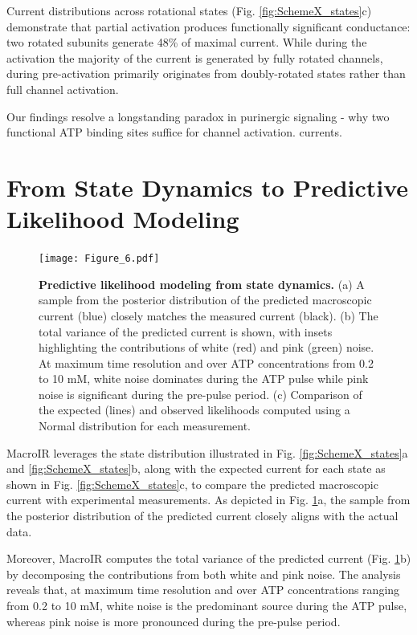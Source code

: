 \documentclass[pdflatex,sn-nature]{sn-jnl}%
\theoremstyle{thmstyleone}%
\theoremstyle{thmstyletwo}%
\theoremstyle{thmstylethree}%
\begin{document}
Current distributions across rotational states (Fig. \ref{fig:SchemeX_states}c) demonstrate that partial activation produces functionally significant conductance: two rotated subunits generate 48\% of maximal current. While during the activation the majority of the current is generated by fully rotated channels, during pre-activation primarily originates from doubly-rotated states rather than full channel activation.

Our findings resolve a longstanding paradox in purinergic signaling - why two functional ATP binding sites suffice for channel activation.  currents. 

\section{From State Dynamics to Predictive Likelihood Modeling}
\label{sec:likelihood}

\begin{figure}[t]
	\centering
	\texttt{[image: Figure\_6.pdf]}
	\caption{\textbf{Predictive likelihood modeling from state dynamics.} (a) A sample from the posterior distribution of the predicted macroscopic current (blue) closely matches the measured current (black). (b) The total variance of the predicted current is shown, with insets highlighting the contributions of white (red) and pink (green) noise. At maximum time resolution and over ATP concentrations from 0.2 to 10 mM, white noise dominates during the ATP pulse while pink noise is significant during the pre-pulse period. (c) Comparison of the expected (lines) and observed likelihoods computed using a Normal distribution for each measurement.}
	\label{fig:SchemeX_likelihood}
\end{figure}

MacroIR leverages the state distribution illustrated in Fig. \ref{fig:SchemeX_states}a and \ref{fig:SchemeX_states}b, along with the expected current for each state as shown in Fig. \ref{fig:SchemeX_states}c, to compare the predicted macroscopic current with experimental measurements. As depicted in Fig. \ref{fig:SchemeX_likelihood}a, the sample from the posterior distribution of the predicted current closely aligns with the actual data. 

Moreover, MacroIR computes the total variance of the predicted current (Fig. \ref{fig:SchemeX_likelihood}b) by decomposing the contributions from both white and pink noise. The analysis reveals that, at maximum time resolution and over ATP concentrations ranging from 0.2 to 10 mM, white noise is the predominant source during the ATP pulse, whereas pink noise is more pronounced during the pre-pulse period.
\end{document}
